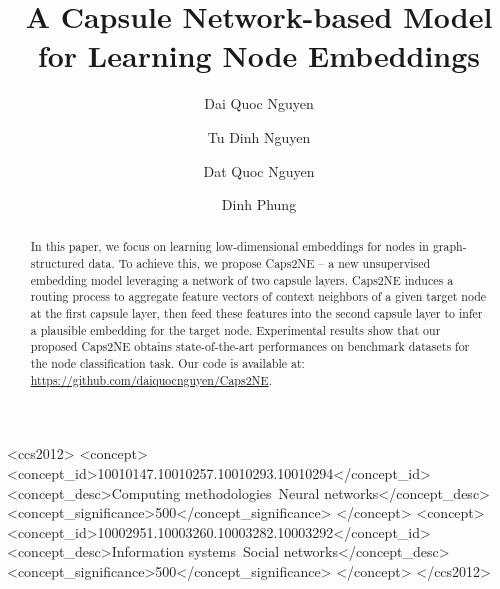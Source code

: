 \documentclass[sigconf]{acmart}
\begin{document}
\title{A Capsule Network-based Model for Learning Node Embeddings}

\author{Dai Quoc Nguyen}


\author{Tu Dinh Nguyen}


\author{Dat Quoc Nguyen}


\author{Dinh Phung}



\begin{CCSXML}
<ccs2012>
<concept>
<concept_id>10010147.10010257.10010293.10010294</concept_id>
<concept_desc>Computing methodologies~Neural networks</concept_desc>
<concept_significance>500</concept_significance>
</concept>
<concept>
<concept_id>10002951.10003260.10003282.10003292</concept_id>
<concept_desc>Information systems~Social networks</concept_desc>
<concept_significance>500</concept_significance>
</concept>
</ccs2012>
\end{CCSXML}



\begin{abstract}
In this paper, we focus on learning low-dimensional embeddings for nodes in graph-structured data. To achieve this, we propose Caps2NE -- a new unsupervised embedding model leveraging a network of two capsule layers. Caps2NE induces a routing process to aggregate feature vectors of context neighbors of a given target node at the first capsule layer, then feed these features into the second capsule layer to infer a plausible embedding for the target node. Experimental results show that our proposed Caps2NE obtains state-of-the-art performances on benchmark datasets for the node classification task. Our code is available at: \url{https://github.com/daiquocnguyen/Caps2NE}.

\end{abstract}

\maketitle
\end{document}
